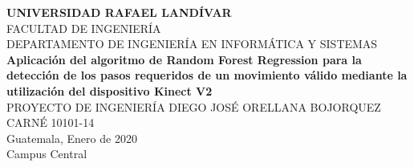 \begin{titlepage}
\begin{center}
{\LARGE \textbf{UNIVERSIDAD RAFAEL LAND\'IVAR}}\\[0.1cm]
{\normalsize FACULTAD DE INGENIER\'IA}\\[0.1cm]
{\normalsize DEPARTAMENTO DE INGENIER\'IA EN INFORM\'ATICA Y SISTEMAS}\\[4cm]
{\huge \textbf{Aplicaci\'on del algoritmo de Random Forest Regression para la detecci\'on de los pasos requeridos de un movimiento v\'alido mediante la utilizaci\'on del dispositivo Kinect V2}}\\[0.1cm]
{\LARGE PROYECTO DE INGENIER\'IA}
\vfill
DIEGO JOS\'E ORELLANA BOJORQUEZ\\[0.1cm]
CARN\'E 10101-14\\[2cm]
Guatemala, Enero de 2020\\[0.1cm]
Campus Central
\afterpage{\blankpage}
\end{center}
\end{titlepage}
